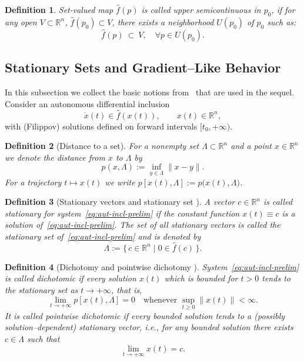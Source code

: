 \documentclass[journal]{IEEEtran}
\theoremstyle{myplain}
\newtheorem{definition}{Definition}
\begin{document}
\begin{definition}
    Set-valued map $\hat f(p)$ is called \textit{upper semicontinuous} in $p_0$, if for any open $V\subset\mathbb{R}^n$, $\hat f(p_0)\subset V$, there exists a neighborhood $U(p_0)$ of $p_0$ such as:
\[ 
\hat f(p) ~\subset ~ V, \quad \forall p\in U(p_0).
\]
\end{definition}


\subsection{Stationary Sets and Gradient--Like Behavior}
\label{subsec:YLG-terms}

In this subsection we collect the basic notions from~\cite{YLG} that are
used in the sequel.  Consider an autonomous differential inclusion
\begin{equation}
  \dot x(t) \in \hat f(x(t)), \qquad x(t)\in\mathbb{R}^n,
  \label{eq:aut-incl-prelim}
\end{equation}
with (Filippov) solutions defined on forward intervals $[t_0,+\infty)$.

\begin{definition}[Distance to a set]
For a nonempty set $\Lambda\subset\mathbb{R}^n$ and a point $x\in\mathbb{R}^n$
we denote the distance from $x$ to $\Lambda$ by
\[
  p(x,\Lambda) := \inf_{y\in\Lambda} \|x-y\|.
\]
For a trajectory $t\mapsto x(t)$ we write
$p[x(t),\Lambda] := p\bigl(x(t),\Lambda\bigr)$.
\end{definition}

\begin{definition}[Stationary vectors and stationary set {\cite[Def.~1.7]{YLG}}]
A vector $c\in\mathbb{R}^n$ is called \emph{stationary} for
system~\eqref{eq:aut-incl-prelim} if the constant function
$x(t)\equiv c$ is a solution of~\eqref{eq:aut-incl-prelim}.
The set of all stationary vectors is called the \emph{stationary set}
of~\eqref{eq:aut-incl-prelim} and is denoted by
\[
  \Lambda := \{\,c\in\mathbb{R}^n \mid 0\in \hat f(c)\,\}.
\]
\end{definition}

\begin{definition}[Dichotomy and pointwise dichotomy {\cite[Defs.~1.8--1.9]{YLG}}]
System~\eqref{eq:aut-incl-prelim} is called
\emph{dichotomic} if every solution $x(t)$ which is bounded for $t>0$
tends to the stationary set as $t\to+\infty$, that is,
\[
   \lim_{t\to+\infty} p[x(t),\Lambda] = 0
   \quad\text{whenever } \sup_{t\ge 0}\|x(t)\|<\infty.
\]
It is called \emph{pointwise dichotomic} if every bounded solution
tends to a (possibly solution–dependent) stationary vector,
i.e., for any bounded solution there exists $c\in\Lambda$ such that
\[
   \lim_{t\to+\infty} x(t) = c.
\]
\end{definition}
\end{document}
